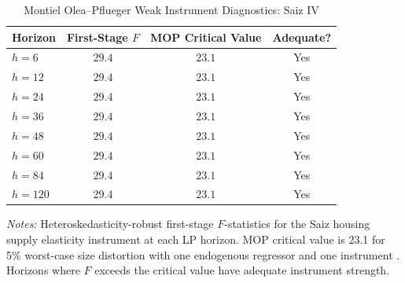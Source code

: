 \begin{table}[H]
\centering
\caption{Montiel Olea--Pflueger Weak Instrument Diagnostics: Saiz IV}
\begin{threeparttable}
\small
\begin{tabular}{lccc}
\toprule
Horizon & First-Stage $F$ & MOP Critical Value & Adequate? \\
\midrule
$h=6$ & $29.4$ & $23.1$ & Yes \\
$h=12$ & $29.4$ & $23.1$ & Yes \\
$h=24$ & $29.4$ & $23.1$ & Yes \\
$h=36$ & $29.4$ & $23.1$ & Yes \\
$h=48$ & $29.4$ & $23.1$ & Yes \\
$h=60$ & $29.4$ & $23.1$ & Yes \\
$h=84$ & $29.4$ & $23.1$ & Yes \\
$h=120$ & $29.4$ & $23.1$ & Yes \\
\bottomrule
\end{tabular}
\begin{tablenotes}[flushleft]
\small
\item \textit{Notes:} Heteroskedasticity-robust first-stage $F$-statistics for the Saiz housing supply elasticity instrument at each LP horizon. MOP critical value is 23.1 for 5\% worst-case size distortion with one endogenous regressor and one instrument \citep{montiel2013robust}. Horizons where $F$ exceeds the critical value have adequate instrument strength.
\end{tablenotes}
\end{threeparttable}
\label{tab:mop}
\end{table}
